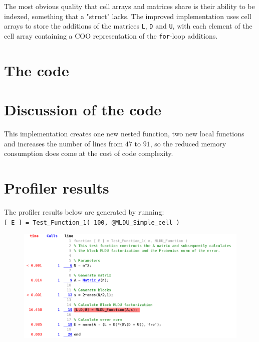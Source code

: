 \noindent The most obvious quality that cell arrays and matrices share is their ability to be indexed, something that a "struct" lacks\autocite[]{math_doc_struct}. The improved implementation uses cell arrays to store the additions of the matrices \texttt{L}, \texttt{D} and \texttt{U}, with each element of the cell array containing a COO representation of the \texttt{for}-loop additions\autocite[]{wiki_coo}.\\

\section{The code}



\section{Discussion of the code}

This implementation creates one new nested function, two new local functions and increases the number of lines from $47$ to $91$, so the reduced memory consumption does come at the cost of code complexity.

\newpage

\section{Profiler results}

\noindent The profiler results below are generated by running:\\

\noindent \texttt{[ E ] = Test\_Function\_1( 100, @MLDU\_Simple\_cell )}\\

\begin{figure}[h!]
    \includegraphics[width=\linewidth]{figures/Profile_MLDU_Simple_cell_1.eps}
    \centering
\end{figure}

